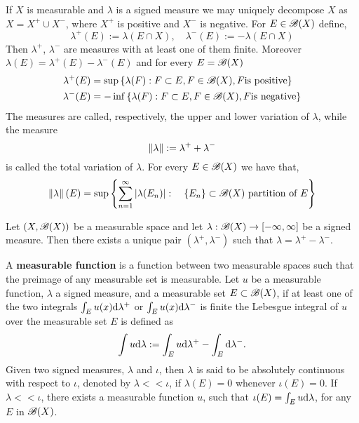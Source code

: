 If $X$ is measurable and $\lambda$ is a signed measure we may uniquely decompose $X$ as $X=X^+\cup X^-$, where $X^+$ is positive and $X^-$ is negative. For $E\in \mathscr{B}(X)$ define,
\begin{equation*}
	\lambda^+(E):=\lambda(E\cap X), \quad \lambda^-(E):=-\lambda(E\cap X)
\end{equation*}
Then $\lambda^+$, $\lambda^-$ are measures with at least one of them finite. Moreover $\lambda(E)=\lambda^+(E)-\lambda^-(E)$ and for every $E=\mathscr{B}(X)$
\begin{align*}
	\lambda^+(E)&=\sup\left\lbrace \lambda(F): F\subset E, F\in\mathscr{B}(X), F \text{is positive} \right\rbrace\\
	\lambda^-(E)&=-\inf\left\lbrace \lambda(F): F\subset E, F\in\mathscr{B}(X), F \text{is negative} \right\rbrace
\end{align*}
The measures are called, respectively, the upper and lower variation of $\lambda$, while the measure 
\begin{equation*}
\left\|\lambda\right\|:=\lambda^++\lambda^-
\end{equation*}
is called the total variation of $\lambda$. For every $E\in\mathscr{B}(X)$ we have that,
\begin{equation}
	\left\|\lambda\right\|(E)=\sup\left\lbrace \sum_{n=1}^{\infty}\left| \lambda(E_n) \right|:\quad \left\lbrace E_n \right\rbrace\subset \mathscr{B}(X) \text{ partition of }E  \right\rbrace
\end{equation}
\begin{theorem}
	Let $(X,\mathscr{B}(X))$ be a measurable space and let $\lambda:\mathscr{B}(X)\rightarrow [-\infty, \infty]$ be a signed measure. Then there exists a unique pair $(\lambda^+, \lambda^-)$ such that $\lambda=\lambda^+-\lambda^-$.
\end{theorem}
A \textbf{measurable function} is a function between two measurable spaces such that the preimage of any measurable set is measurable. Let $u$ be a measurable function, $\lambda$ a signed measure, and a measurable set $E\subset \mathscr{B}(X)$, if at least one of the two integrals $\int_E u(x)\mathrm{d}\lambda^+$ or $\int_E u(x)\mathrm{d}\lambda^-$ is finite the Lebesgue integral of $u$ over the measurable set $E$ is defined as 
\begin{equation}
	\int u\mathrm{d}\lambda:=\int_Eu\mathrm{d}\lambda^+-\int_E\mathrm{d}\lambda^-.
\end{equation}
Given two signed measures, $\lambda$ and $\iota$, then $\lambda$ is said to be absolutely continuous with respect to $\iota$, denoted by $\lambda<<\iota$, if $\lambda(E)=0$ whenever $\iota(E)=0$. If $\lambda<<\iota$, there exists a measurable function $u$, such that $\iota(E)=\int_E u\mathrm{d}\lambda$,  for any $E$ in $\mathscr{B}(X)$. 
\\

